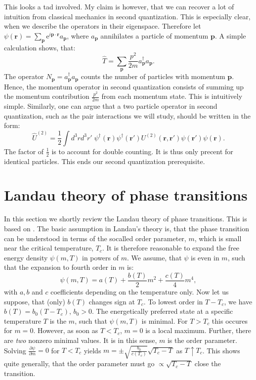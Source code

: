This looks a tad involved. My claim is however, that we can recover a lot of intuition from classical mechanics in second quantization. This is especially clear, when we describe the operators in their eigenspace. Therefore let $\psi(\mathbf{r}) = \sum_{\mathbf{p}} \text{e}^{i\mathbf{p}\cdot \mathbf{r}} a_\mathbf{p}$, where $a_\mathbf{p}$ annihilates a particle of momentum $\mathbf{p}$. A simple calculation shows, that:
\begin{equation}
\hat{T} = \sum_\mathbf{p} \frac{p^2}{2m} a^\dagger_\mathbf{p}a_\mathbf{p}.
\end{equation}
The operator $N_\mathbf{p} = a^\dagger_\mathbf{p}a_\mathbf{p}$ counts the number of particles with momentum $\mathbf{p}$. Hence, the momentum operator in second quantization consists of summing up the momentum contribution $\frac{p^2}{2m}$ from each momentum state. This is intuitively simple. Similarly, one can argue that a two particle operator in second quantization, such as the pair interactions we will study, should be written in the form:
\begin{equation}
\hat{U}^{(2)} = \frac{1}{2}\int d^3 r d^3 r' \; \psi^\dagger(\mathbf{r}) \psi^\dagger(\mathbf{r}') U^{(2)}(\mathbf{r},\mathbf{r}')\psi(\mathbf{r}')\psi(\mathbf{r}). 
\label{eq.InteractionHamiltonain2ndQuantization} 
\end{equation}
The factor of $\frac{1}{2}$ is to account for double counting. It is thus only precent for identical particles. This ends our second quantization prerequisite. 

\section{Landau theory of phase transitions}
\label{sec.landauphasetransitions}
In this section we shortly review the Landau theory of phase transitions. This is based on \cite[pp. 86-88]{PlischkeStatPhys}. The basic assumption in Landau's theory is, that the phase transition can be understood in terms of the socalled order parameter, $m$, which is small near the critical temperature, $T_c$. It is therefore reasonable to expand the free energy density $\psi(m, T)$ in powers of $m$. We assume, that $\psi$ is even in $m$, such that the expansion to fourth order in $m$ is:
\begin{equation}
\psi(m, T) = a(T) + \frac{b(T)}{2}m^2 + \frac{c(T)}{4}m^4, 
\label{eq.freeenergydensity.mexpansion}
\end{equation}
with $a, b$ and $c$ coefficients depending on the temperature only. Now let us suppose, that (only) $b(T)$ changes sign at $T_c$. To lowest order in $T - T_c$, we have $b(T) = b_0 (T - T_c)$, $b_0 > 0$. The energetically preferred state at a specific temperature $T$ is the $m$, such that $\psi(m, T)$ is minimal. For $T > T_c$ this occures for $m = 0$. However, as soon as $T < T_c$, $m = 0$ is a local maximum. Further, there are \textit{two} nonzero minimal values. It is in this sense, $m$ is the order parameter. Solving $\frac{\partial \psi}{\partial m} = 0$ for $T < T_c$ yields $m = \pm \sqrt{\frac{b_0}{c(T_c)}}\sqrt{T_c-T}$ as $T \uparrow T_c$. This shows quite generally, that the order parameter must go $\propto \sqrt{T_c - T}$ close the transition. 

